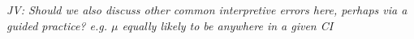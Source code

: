 \begin{spacing}{1.5}
\textit{JV: Should we also discuss other common interpretive errors here, perhaps via a guided practice? e.g. $\mu$ equally likely to be anywhere in a given CI}

\end{spacing}
